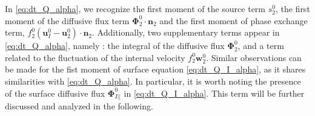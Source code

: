 In \ref{eq:dt_Q_alpha}, we recognize the first moment of the source term $s_2^0$, the first moment of the diffusive flux term $\mathbf{\Phi}_2^0\cdot\textbf{n}_2$ and the first moment of phase exchange term, $f_2^0 (\textbf{u}_I^0-\textbf{u}_2^0)\cdot\textbf{n}_2$. 
Additionally, two supplementary terms appear in \ref{eq:dt_Q_alpha}, namely : the integral of the diffusive flux $\mathbf{\Phi}_2^0$, and a term related to the fluctuation of the internal velocity $f_2^0 \textbf{w}_2^0$.
Similar observations can be made for the fist moment of surface equation \ref{eq:dt_Q_I_alpha}, as it shares similarities with \ref{eq:dt_Q_alpha}. 
In particular, it is worth noting the presence of the surface diffusive flux $\mathbf{\Phi}_{I||}^0$ in \ref{eq:dt_Q_I_alpha}.
This term will be further discussed and analyzed in the following. 

